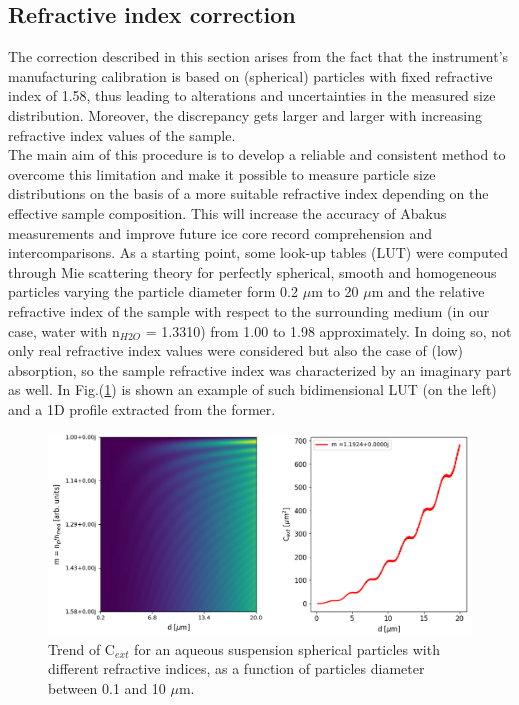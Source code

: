 \documentclass[a4paper, 11pt]{report}
\begin{document}
\subsection{Refractive index correction}
\label{RI_calibration_subsection}

The correction described in this section arises from the fact that the instrument’s manufacturing calibration is based on (spherical) particles with fixed refractive index of 1.58, thus leading to alterations and uncertainties in the measured size distribution. 
Moreover, the discrepancy gets larger and larger with increasing refractive index values of the sample. \\
The main aim of this procedure is to develop a reliable and consistent method to overcome this limitation and make it possible to measure particle size distributions on the basis of a more suitable refractive index depending on the effective sample composition. This will increase the accuracy of Abakus measurements and improve future ice core record comprehension and intercomparisons.
As a starting point, some look-up tables (LUT) were computed through Mie scattering theory for perfectly spherical, smooth and homogeneous particles varying the particle diameter form 0.2 $\mu$m to 20 $\mu$m and the relative refractive index of the sample with respect to the surrounding medium (in our case, water with n$_{H2O}$ = 1.3310) from 1.00 to 1.98 approximately.
In doing so, not only real refractive index values were considered but also the case of (low) absorption, so the sample refractive index was characterized by an imaginary part as well.
In Fig.(\ref{cext_2D}) is shown an example of such bidimensional LUT (on the left) and a 1D profile extracted from the former.
\begin{figure}[!htb]
	\centering	
	\includegraphics[scale=0.6]{Cext_2D.png}
	\caption{Trend of C$_{ext}$ for an aqueous suspension spherical particles with different refractive indices, as a function of particles diameter between 0.1 and 10 $\mu$m.}
	\label{cext_2D}
\end{figure}
\end{document}
